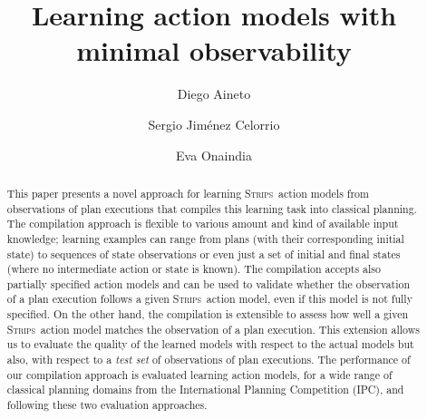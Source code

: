 \documentclass[3p,times]{elsarticle}
\newcommand{\strips}{\textsc{Strips}}     %
\begin{document}
\begin{frontmatter}



\dochead{}

\title{Learning action models with minimal observability}
\author[label1]{Diego Aineto}
\author[label1]{Sergio Jim\'{e}nez Celorrio}
\author[label1]{Eva Onaindia}
\address[label1]{Department of Computer Systems and Computation, Universitat Polit\`ecnica de Val\`encia. Spain}




\begin{abstract}
  This paper presents a novel approach for learning \strips\ action models from observations of plan executions that compiles this learning task into classical planning. The compilation approach is flexible to various amount and kind of available input knowledge; learning examples can range from plans (with their corresponding initial state) to sequences of state observations or even just a set of initial and final states (where no intermediate action or state is known). The compilation accepts also partially specified action models and can be used to validate whether the observation of a plan execution follows a given \strips\ action model, even if this model is not fully specified. On the other hand, the compilation is extensible to assess how well a given \strips\ action model matches the observation of a plan execution. This extension allows us to evaluate the quality of the learned models with respect to the actual models but also, with respect to a {\em test set} of observations of plan executions. The performance of our compilation approach is evaluated learning action models, for a wide range of classical planning domains from the International Planning Competition (IPC), and following these two evaluation approaches.
\end{abstract}


\end{frontmatter}
\end{document}
